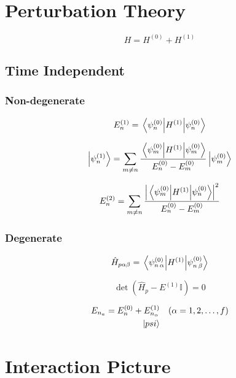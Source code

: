 \documentclass[a4paper, twocolumn]{article}
\begin{document}
\section{Perturbation Theory}

\begin{equation*}
    H = H^{(0)} + H^{(1)}
\end{equation*}

\subsection{Time Independent}
\subsubsection{Non-degenerate}
\begin{equation*}
    E_{n}^{(1)} = \expval{H^{(1)}}{\psi_{n}^{(0)}}
\end{equation*}

\begin{equation*}
    \ket{\psi_{n}^{(1)}} = \sum\limits_{m \neq n}
        \frac{ \expval{H^{(1)}}{\psi_{m}^{(0)}} }{ E_n^{(0)} - E_m^{(0)} }
        \ket{\psi_{m}^{(0)}}
\end{equation*}

\begin{equation*}
    E_{n}^{(2)} = \sum\limits_{m \neq n}
    \frac{ \abs{ \mel{\psi_{m}^{(0)}}{H^{(1)}}{\psi_{n}^{(0)}} }^2 }{ E_n^{(0)} - E_m^{(0)} }
\end{equation*}

\subsubsection{Degenerate}

\begin{equation*}
    \hat{H}_{p \alpha \beta} = \mel{\psi_{n\,\alpha}^{(0)}}{H^{(1)}}{\psi_{n\,\beta}^{(0)}}
\end{equation*}

\begin{equation*}
    \det ( \hat{H}_{p} - E^{(1)} \mathbb{I}) = 0
\end{equation*}

\begin{align*}
    E_{n_a} = E_{n}^{(0)} + E_{n_\alpha}^{(1)} && (\alpha = 1,2,\dots,f) \\
    \ket{psi}
\end{align*}


\section{Interaction Picture}
\end{document}
